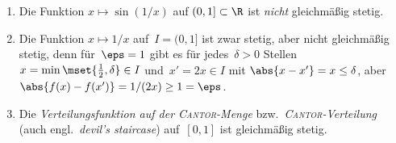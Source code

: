 \documentclass[a4paper]{article}
\begin{document}
\begin{example}\leavevmode
    \begin{enumerate}
        \item Die Funktion $x \mapsto \sin(1/x)$ auf $(0, 1] \subset \R$ ist \emph{nicht} gleichmäßig stetig.
              \begin{center}
              \end{center}
        \item Die Funktion $x \mapsto 1/x$ auf~$I = (0, 1]$ ist zwar stetig, aber nicht gleichmäßig stetig, denn für~$\eps = 1$ gibt es für jedes~$\delta > 0$ Stellen $x = \min\mset{\frac{1}{2},\delta} \in I$ und~$x' = 2x \in I$ mit $\abs{x-x'} = x \leq \delta$, aber $\abs{f(x)-f(x')} = 1/(2x) \geq 1 = \eps$.
        \item Die \emph{Verteilungsfunktion auf der \textsc{Cantor}-Menge} bzw.\ \emph{\textsc{Cantor}-Verteilung} (auch engl.\ \emph{devil's staircase}) auf~$[0, 1]$ ist gleichmäßig stetig.


\end{enumerate}
\end{example}
\end{document}
